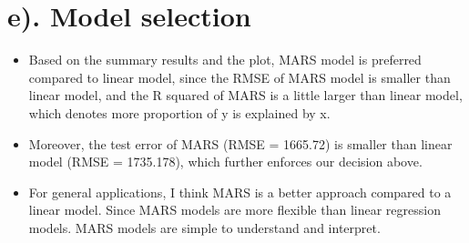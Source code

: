 \documentclass[
]{article}
\begin{document}
\hypertarget{e.-model-selection}{%
\section{e). Model selection}\label{e.-model-selection}}

\begin{itemize}
\item
  Based on the summary results and the plot, MARS model is preferred
  compared to linear model, since the RMSE of MARS model is smaller than
  linear model, and the R squared of MARS is a little larger than linear
  model, which denotes more proportion of y is explained by x.
\item
  Moreover, the test error of MARS (RMSE = 1665.72) is smaller than
  linear model (RMSE = 1735.178), which further enforces our decision
  above.
\item
  For general applications, I think MARS is a better approach compared
  to a linear model. Since MARS models are more flexible than linear
  regression models. MARS models are simple to understand and interpret.
\end{itemize}
\end{document}
